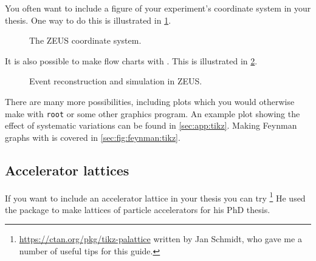 You often want to include a figure of your experiment's coordinate
system in your thesis. One way to do this is illustrated in
\cref{fig:tikz:coord}.

\begin{figure}[htbp]
  \centering
  
  \caption{The ZEUS coordinate system.}%
  \label{fig:tikz:coord}
\end{figure}

It is also possible to make flow charts with \TikZ. This is
illustrated in \cref{fig:tikz:flow}.

\begin{figure}[htbp]
  \centering
  
  \caption[Event reconstruction and simulation in ZEUS]{Event reconstruction and simulation in ZEUS.}%
  \label{fig:tikz:flow}
\end{figure}

There are many more possibilities,
including plots which you would otherwise make with \texttt{root} or
some other graphics program. An example plot showing the effect of
systematic variations can be found in \cref{sec:app:tikz}. Making
Feynman graphs with \TikZ is covered in \cref{sec:fig:feynman:tikz}.


\subsection{Accelerator lattices}%
\label{sec:fig:accelerator}

If you want to include an accelerator lattice in your thesis you can try
\footnote{%
  \url{https://ctan.org/pkg/tikz-palattice}
  written by Jan Schmidt, who gave me a number of useful tips for this guide.}
He used the package to make lattices of particle accelerators for his PhD thesis.

